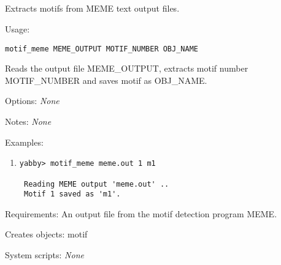 

\subsection[motif\_meme]{  }



Extracts motifs from MEME text output files.


\begin{description}


\item{Usage:}

{\tt motif\_meme MEME\_OUTPUT MOTIF\_NUMBER OBJ\_NAME}

 Reads the output file MEME\_OUTPUT, extracts motif number
 MOTIF\_NUMBER and saves motif as OBJ\_NAME.


\item{Options:} {\em None}


\item{Notes:} {\em None}


\item{Examples:}
\begin{enumerate}

\item
\begin{verbatim}
yabby> motif_meme meme.out 1 m1

 Reading MEME output 'meme.out' ..
 Motif 1 saved as 'm1'.

\end{verbatim}

\end{enumerate}


\item{Requirements:} An output file from the motif detection program MEME.


\item{Creates objects:} motif


\item{System scripts:} {\em None}

\end{description}

